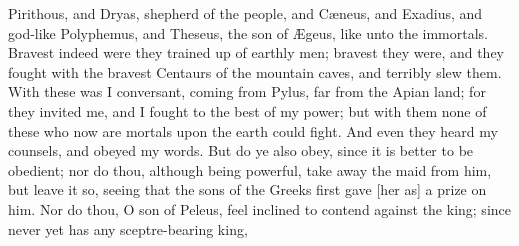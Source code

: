 \documentclass{ransom}
\begin{document}
Pirithous, and Dryas, shepherd of the people, and Cæneus, and Exadius,
and god-like Polyphemus, and Theseus, the son of Ægeus, like unto
the immortals. Bravest indeed were they trained up of earthly men;
bravest they were, and they fought with the bravest Centaurs of the
mountain caves, and terribly slew them. With these was I conversant,
coming from Pylus, far from the Apian land; for they invited me, and I
fought to the best of my power; but with them none of these who now are
mortals upon the earth could fight. And even they heard my counsels,
and obeyed my words. But do ye also obey, since it is better to be
obedient; nor do thou, although being powerful, take away the maid from
him, but leave it so, seeing that the sons of the Greeks first gave
[her as] a prize on him. Nor do thou, Ο son of Peleus, feel inclined to
contend against the king; since never yet has any sceptre-bearing king,
\end{document}

